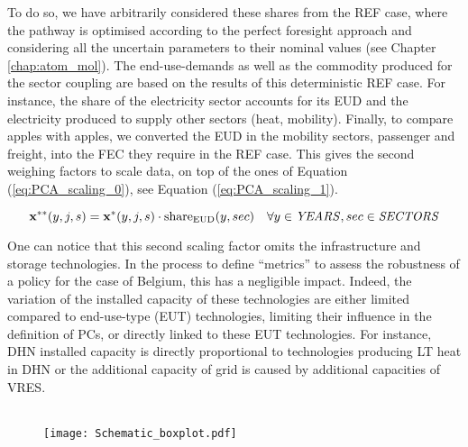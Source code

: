 To do so, we have arbitrarily considered these shares from the REF case, where the pathway is optimised according to the perfect foresight approach and considering all the uncertain parameters to their nominal values (see Chapter \ref{chap:atom_mol}).  The end-use-demands as well as the commodity produced for the sector coupling are based on the results of this deterministic REF case.  For instance, the share of the electricity sector accounts for its \gls{EUD} and the electricity produced to supply other sectors (\eg heat, mobility). Finally, to compare apples with apples, we converted the \gls{EUD} in the mobility sectors, \ie passenger and freight, into the \gls{FEC} they require in the REF case. This gives the second weighing factors to scale data, on top of the ones of Equation (\ref{eq:PCA_scaling_0}), see Equation (\ref{eq:PCA_scaling_1}).

\begin{equation}
 \label{eq:PCA_scaling_1}
\textbf{x}^{**}(y,j,s)=\textbf{x}^{*}(y,j,s)\cdot \text{share}_{\text{EUD}}(y,sec)
 \quad \forall y \in \text{\emph{YEARS}}, sec \in \text{\emph{SECTORS}}
\end{equation}

One can notice that this second scaling factor omits the infrastructure and storage technologies. In the process to define ``metrics'' to assess the robustness of a policy for the case of Belgium, this has a negligible impact. Indeed, the variation of the installed capacity of these technologies are either limited compared to end-use-type (EUT) technologies, \ie limiting their influence in the definition of PCs, or directly linked to these EUT technologies. For instance, \gls{DHN} installed capacity is directly proportional to technologies producing \gls{LT} heat in \gls{DHN} or the additional capacity of grid is caused by additional capacities of \gls{VRES}. \\

\\

\begin{wrapfigure}{r}{3cm}
\centering
\captionsetup{justification=centering}
\texttt{[image: Schematic\_boxplot.pdf]}
\caption{}
\label{fig:Schematic_boxplot_methodo}
\end{wrapfigure}

